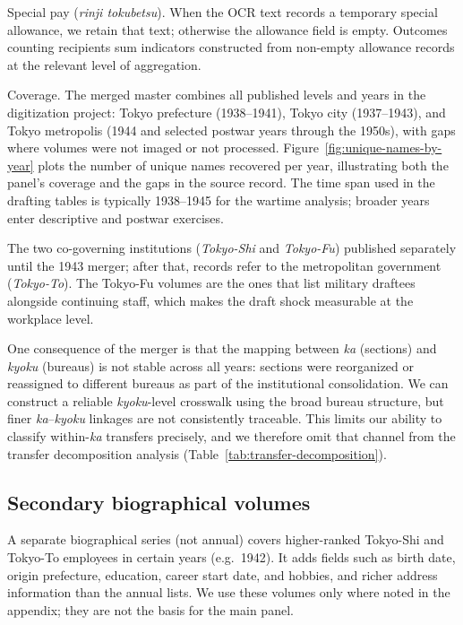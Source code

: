 Special pay (\emph{rinji tokubetsu}). When the OCR text records a temporary special allowance, we retain that text; otherwise the allowance field is empty. Outcomes counting recipients sum indicators constructed from non-empty allowance records at the relevant level of aggregation.

Coverage. The merged master combines all published levels and years in the digitization project: Tokyo prefecture (1938--1941), Tokyo city (1937--1943), and Tokyo metropolis (1944 and selected postwar years through the 1950s), with gaps where volumes were not imaged or not processed. Figure~\ref{fig:unique-names-by-year} plots the number of unique names recovered per year, illustrating both the panel's coverage and the gaps in the source record. The time span used in the drafting tables is typically 1938--1945 for the wartime analysis; broader years enter descriptive and postwar exercises.

The two co-governing institutions (\emph{Tokyo-Shi} and \emph{Tokyo-Fu}) published separately until the 1943 merger; after that, records refer to the metropolitan government (\emph{Tokyo-To}). The Tokyo-Fu volumes are the ones that list military draftees alongside continuing staff, which makes the draft shock measurable at the workplace level.

\label{sec:data-limitations}
One consequence of the merger is that the mapping between \emph{ka} (sections) and \emph{kyoku} (bureaus) is not stable across all years: sections were reorganized or reassigned to different bureaus as part of the institutional consolidation. We can construct a reliable \emph{kyoku}-level crosswalk using the broad bureau structure, but finer \emph{ka}--\emph{kyoku} linkages are not consistently traceable. This limits our ability to classify within-\emph{ka} transfers precisely, and we therefore omit that channel from the transfer decomposition analysis (Table~\ref{tab:transfer-decomposition}).

\subsection{Secondary biographical volumes}

A separate biographical series (not annual) covers higher-ranked Tokyo-Shi and Tokyo-To employees in certain years (e.g.\ 1942). It adds fields such as birth date, origin prefecture, education, career start date, and hobbies, and richer address information than the annual lists. We use these volumes only where noted in the appendix; they are not the basis for the main panel.

